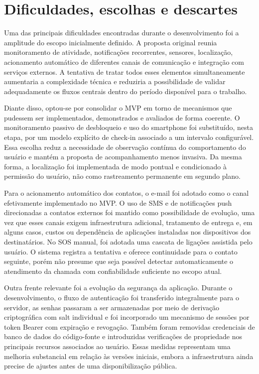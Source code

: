 \section{Dificuldades, escolhas e descartes}

Uma das principais dificuldades encontradas durante o desenvolvimento foi a amplitude do escopo inicialmente definido. A proposta original reunia monitoramento de atividade, notificações recorrentes, sensores, localização, acionamento automático de diferentes canais de comunicação e integração com serviços externos. A tentativa de tratar todos esses elementos simultaneamente aumentaria a complexidade técnica e reduziria a possibilidade de validar adequadamente os fluxos centrais dentro do período disponível para o trabalho.

Diante disso, optou-se por consolidar o MVP em torno de mecanismos que pudessem ser implementados, demonstrados e avaliados de forma coerente. O monitoramento passivo de desbloqueio e uso do smartphone foi substituído, nesta etapa, por um modelo explícito de check-in associado a um intervalo configurável. Essa escolha reduz a necessidade de observação contínua do comportamento do usuário e mantém a proposta de acompanhamento menos invasiva. Da mesma forma, a localização foi implementada de modo pontual e condicionado à permissão do usuário, não como rastreamento permanente em segundo plano.

Para o acionamento automático dos contatos, o e-mail foi adotado como o canal efetivamente implementado no MVP. O uso de SMS e de notificações push direcionadas a contatos externos foi mantido como possibilidade de evolução, uma vez que esses canais exigem infraestrutura adicional, tratamento de entrega e, em alguns casos, custos ou dependência de aplicações instaladas nos dispositivos dos destinatários. No SOS manual, foi adotada uma cascata de ligações assistida pelo usuário. O sistema registra a tentativa e oferece continuidade para o contato seguinte, porém não presume que seja possível detectar automaticamente o atendimento da chamada com confiabilidade suficiente no escopo atual.

Outra frente relevante foi a evolução da segurança da aplicação. Durante o desenvolvimento, o fluxo de autenticação foi transferido integralmente para o servidor, as senhas passaram a ser armazenadas por meio de derivação criptográfica com salt individual e foi incorporado um mecanismo de sessões por token Bearer com expiração e revogação. Também foram removidas credenciais de banco de dados do código-fonte e introduzidas verificações de propriedade nos principais recursos associados ao usuário. Essas medidas representam uma melhoria substancial em relação às versões iniciais, embora a infraestrutura ainda precise de ajustes antes de uma disponibilização pública.

